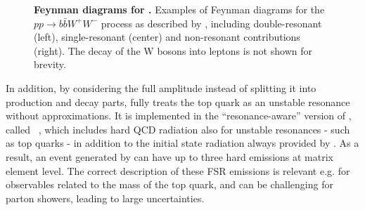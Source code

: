 \begin{figure}[t]
    \hfill
    \caption{\textbf{Feynman diagrams for \bbfourl.} Examples of Feynman diagrams for the $pp \to b \bar{b} W^+ W^-$ process as described by \bbfourl, including double-resonant (left), single-resonant (center) and non-resonant contributions (right). The decay of the W bosons into leptons is not shown for brevity.}
    \label{fig:bb4l:feynman}
\end{figure}

In addition, by considering the full amplitude instead of splitting it into production and decay parts, \bbfourl fully treats the top quark as an unstable resonance without approximations. It is implemented in the ``resonance-aware'' version of \powheg, called \powhegvres~\cite{Jezo:2015aia}, which includes hard QCD radiation also for unstable resonances - such as top quarks - in addition to the initial state radiation always provided by \powheg. As a result, an event generated by \bbfourl can have up to three hard emissions at matrix element level. The correct description of these FSR emissions is relevant e.g. for observables related to the mass of the top quark, and can be challenging for parton showers, leading to large uncertainties.

